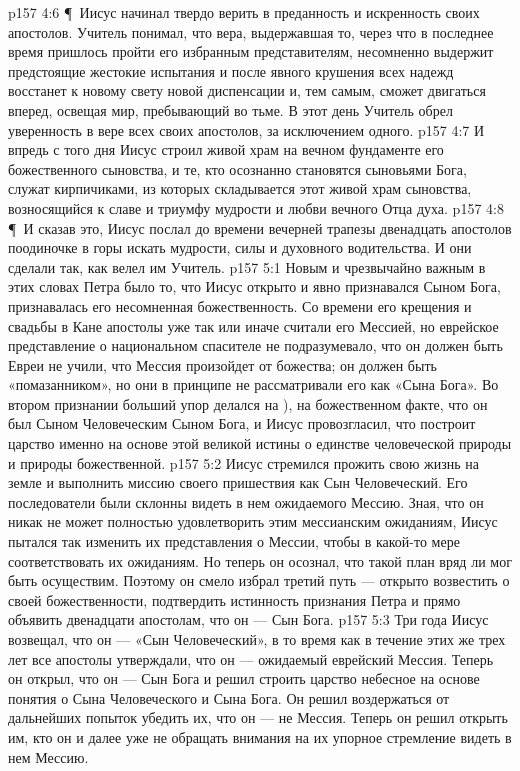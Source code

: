 \vs p157 4:6 \P\ Иисус начинал твердо верить в преданность и искренность своих апостолов. Учитель понимал, что вера, выдержавшая то, через что в последнее время пришлось пройти его избранным представителям, несомненно выдержит предстоящие жестокие испытания и после явного крушения всех надежд восстанет к новому свету новой диспенсации и, тем самым, сможет двигаться вперед, освещая мир, пребывающий во тьме. В этот день Учитель обрел уверенность в вере всех своих апостолов, за исключением одного.
\vs p157 4:7 И впредь с того дня Иисус строил живой храм на вечном фундаменте его божественного сыновства, и те, кто осознанно становятся сыновьями Бога, служат кирпичиками, из которых складывается этот живой храм сыновства, возносящийся к славе и триумфу мудрости и любви вечного Отца духа.
\vs p157 4:8 \P\ И сказав это, Иисус послал до времени вечерней трапезы двенадцать апостолов поодиночке в горы искать мудрости, силы и духовного водительства. И они сделали так, как велел им Учитель.
\vs p157 5:1 Новым и чрезвычайно важным в этих словах Петра было то, что Иисус открыто и явно признавался Сыном Бога, признавалась его несомненная божественность. Со времени его крещения и свадьбы в Кане апостолы уже так или иначе считали его Мессией, но еврейское представление о национальном спасителе не подразумевало, что он должен быть  Евреи не учили, что Мессия произойдет от божества; он должен быть «помазанником», но они в принципе не рассматривали его как «Сына Бога». Во втором признании больший упор делался на  ), на божественном факте, что он был Сыном Человеческим  Сыном Бога, и Иисус провозгласил, что построит царство именно на основе этой великой истины о единстве человеческой природы и природы божественной.
\vs p157 5:2 Иисус стремился прожить свою жизнь на земле и выполнить миссию своего пришествия как Сын Человеческий. Его последователи были склонны видеть в нем ожидаемого Мессию. Зная, что он никак не может полностью удовлетворить этим мессианским ожиданиям, Иисус пытался так изменить их представления о Мессии, чтобы в какой\hyp{}то мере соответствовать их ожиданиям. Но теперь он осознал, что такой план вряд ли мог быть осуществим. Поэтому он смело избрал третий путь --- открыто возвестить о своей божественности, подтвердить истинность признания Петра и прямо объявить двенадцати апостолам, что он --- Сын Бога.
\vs p157 5:3 Три года Иисус возвещал, что он --- «Сын Человеческий», в то время как в течение этих же трех лет все апостолы утверждали, что он --- ожидаемый еврейский Мессия. Теперь он открыл, что он --- Сын Бога и решил строить царство небесное на основе понятия о  Сына Человеческого и Сына Бога. Он решил воздержаться от дальнейших попыток убедить их, что он --- не Мессия. Теперь он решил открыть им, кто он  и далее уже не обращать внимания на их упорное стремление видеть в нем Мессию.
